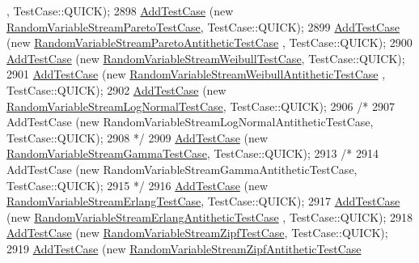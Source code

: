 \begin{DoxyCode}
      , TestCase::QUICK);
2898   \hyperlink{classns3_1_1TestCase_a3718088e3eefd5d6454569d2e0ddd835}{AddTestCase} (\textcolor{keyword}{new} \hyperlink{classRandomVariableStreamParetoTestCase}{RandomVariableStreamParetoTestCase}, 
      TestCase::QUICK);
2899   \hyperlink{classns3_1_1TestCase_a3718088e3eefd5d6454569d2e0ddd835}{AddTestCase} (\textcolor{keyword}{new} \hyperlink{classRandomVariableStreamParetoAntitheticTestCase}{RandomVariableStreamParetoAntitheticTestCase}
      , TestCase::QUICK);
2900   \hyperlink{classns3_1_1TestCase_a3718088e3eefd5d6454569d2e0ddd835}{AddTestCase} (\textcolor{keyword}{new} \hyperlink{classRandomVariableStreamWeibullTestCase}{RandomVariableStreamWeibullTestCase}, 
      TestCase::QUICK);
2901   \hyperlink{classns3_1_1TestCase_a3718088e3eefd5d6454569d2e0ddd835}{AddTestCase} (\textcolor{keyword}{new} \hyperlink{classRandomVariableStreamWeibullAntitheticTestCase}{RandomVariableStreamWeibullAntitheticTestCase}
      , TestCase::QUICK);
2902   \hyperlink{classns3_1_1TestCase_a3718088e3eefd5d6454569d2e0ddd835}{AddTestCase} (\textcolor{keyword}{new} \hyperlink{classRandomVariableStreamLogNormalTestCase}{RandomVariableStreamLogNormalTestCase}, 
      TestCase::QUICK);
2906   \textcolor{comment}{/*}
2907 \textcolor{comment}{  AddTestCase (new RandomVariableStreamLogNormalAntitheticTestCase, TestCase::QUICK);}
2908 \textcolor{comment}{  */}
2909   \hyperlink{classns3_1_1TestCase_a3718088e3eefd5d6454569d2e0ddd835}{AddTestCase} (\textcolor{keyword}{new} \hyperlink{classRandomVariableStreamGammaTestCase}{RandomVariableStreamGammaTestCase}, 
      TestCase::QUICK);
2913   \textcolor{comment}{/*}
2914 \textcolor{comment}{  AddTestCase (new RandomVariableStreamGammaAntitheticTestCase, TestCase::QUICK);}
2915 \textcolor{comment}{  */}
2916   \hyperlink{classns3_1_1TestCase_a3718088e3eefd5d6454569d2e0ddd835}{AddTestCase} (\textcolor{keyword}{new} \hyperlink{classRandomVariableStreamErlangTestCase}{RandomVariableStreamErlangTestCase}, 
      TestCase::QUICK);
2917   \hyperlink{classns3_1_1TestCase_a3718088e3eefd5d6454569d2e0ddd835}{AddTestCase} (\textcolor{keyword}{new} \hyperlink{classRandomVariableStreamErlangAntitheticTestCase}{RandomVariableStreamErlangAntitheticTestCase}
      , TestCase::QUICK);
2918   \hyperlink{classns3_1_1TestCase_a3718088e3eefd5d6454569d2e0ddd835}{AddTestCase} (\textcolor{keyword}{new} \hyperlink{classRandomVariableStreamZipfTestCase}{RandomVariableStreamZipfTestCase}, 
      TestCase::QUICK);
2919   \hyperlink{classns3_1_1TestCase_a3718088e3eefd5d6454569d2e0ddd835}{AddTestCase} (\textcolor{keyword}{new} \hyperlink{classRandomVariableStreamZipfAntitheticTestCase}{RandomVariableStreamZipfAntitheticTestCase}

\end{DoxyCode}
